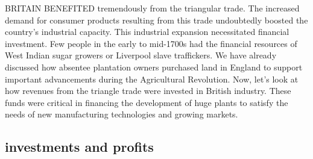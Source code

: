 BRITAIN BENEFITED tremendously from the triangular trade. The increased demand for consumer products resulting from this trade undoubtedly boosted the country's industrial capacity. This industrial expansion necessitated financial investment. Few people in the early to mid-1700s had the financial resources of West Indian sugar growers or Liverpool slave traffickers. We have already discussed how absentee plantation owners purchased land in England to support important advancements during the Agricultural Revolution. Now, let's look at how revenues from the triangle trade were invested in British industry. These funds were critical in financing the development of huge plants to satisfy the needs of new manufacturing technologies and growing markets.
\subsection{investments and profits}
